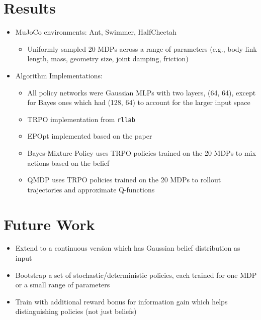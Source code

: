 \documentclass{article}
\begin{document}
\section{Results}

\begin{itemize}
	\item MuJoCo environments: Ant, Swimmer, HalfCheetah
	\begin{itemize}
		\item Uniformly sampled 20 MDPs across a range of parameters (e.g., body link length, mass, geometry size, joint damping, friction)
	\end{itemize}
	\item Algorithm Implementations:
	\begin{itemize}
		\item All policy networks were Gaussian MLPs with two layers, (64, 64), except for Bayes ones which had (128, 64) to account for the larger input space
		\item TRPO implementation from \texttt{rllab}
		\item EPOpt implemented based on the paper
		\item Bayes-Mixture Policy uses TRPO policies trained on the 20 MDPs to mix actions based on the belief
		\item QMDP uses TRPO policies trained on the 20 MDPs to rollout trajectories and approximate Q-functions
	\end{itemize}
\end{itemize}

\section{Future Work}

\begin{itemize}
	\item Extend to a continuous version which has Gaussian belief distribution as input
	\item Bootstrap a set of stochastic/deterministic policies, each trained for one MDP or a small range of parameters
	\item Train with additional reward bonus for information gain which helps distinguishing policies (not just beliefs)
\end{itemize}
\end{document}
